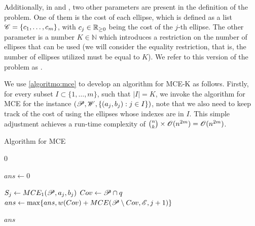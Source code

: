 Additionally, in  and , two other parameters are present in the definition of the problem. One of them is the cost of each ellipse, which is defined as a list $\mathscr{C}=\{c_1, \dots, c_m\}$, with $c_j\in\mathbb{R}_{\ge0}$ being the cost of the $j$-th ellipse.
The other parameter is a number $K\in \mathbb{N}$ which introduces a restriction on the number of ellipses that can be used (we will consider the equality restriction, that is, the number of ellipses utilized must be equal to $K$). We refer to this version of the problem as .

We use \autoref{algoritmo:mce} to develop an algorithm for MCE-K as follows. Firstly, for every subset $I \subset \{1, \dots, m\}$, such that $|I| = K$, we invoke the algorithm for MCE for the instance $(\mathscr{P}, \mathscr{W}, \{(a_j, b_j) : j \in I\})$, note that we also need to keep track of the cost of using the ellipses whose indexes are in $I$. This simple adjustment achieves a run-time complexity of $\binom{n}{k} \times \mathscr{O}(n^{2m}) = \mathscr{O}(n^{2m})$. 

\begin{algoritmo}
    \caption{Algorithm for MCE}\label{algoritmo:mce}
    \begin{algorithmic}[1]
        
        
        \item[]
        
        \State \Return $0$
        \EndIf
        
        \State $ans \gets 0$

        \State $S_j \gets MCE_1(\mathscr{P}, a_j, b_j)$
        \State $Cov \gets \mathscr{P} \cap q$
        \State $ans \gets \max\{ans, w(Cov) + MCE(\mathscr{P} \setminus Cov, \mathscr{E}, j+1)\}$ 
        \EndFor

        \State \Return $ans$
        \EndProcedure
    \end{algorithmic}
\end{algoritmo}